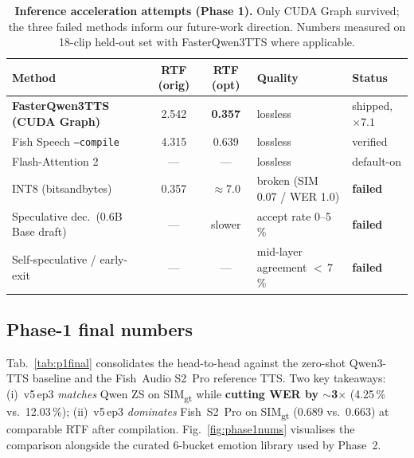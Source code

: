 \documentclass[10pt,a4paper]{article}
\begin{document}
\begin{table}[t]
\centering\small
\caption{\textbf{Inference acceleration attempts (Phase 1).} Only CUDA
Graph survived; the three failed methods inform our future-work direction.
Numbers measured on 18-clip held-out set with FasterQwen3TTS where
applicable.}
\label{tab:accel}
\footnotesize
\begin{tabular}{@{}lccll@{}}
\toprule
\textbf{Method} & \textbf{RTF (orig)} & \textbf{RTF (opt)} &
\textbf{Quality} & \textbf{Status} \\
\midrule
\rowcolor{success!8}
\textbf{FasterQwen3TTS (CUDA Graph)} & 2.542 & \textbf{0.357} & lossless     & shipped, $\times7.1$ \\
Fish Speech \texttt{--compile}        & 4.315 & 0.639          & lossless     & verified \\
Flash-Attention 2                     & ---    & ---            & lossless     & default-on \\
\rowcolor{fail!7}
INT8 (bitsandbytes)                   & 0.357  & $\approx$7.0   & broken (SIM 0.07 / WER 1.0) & \textbf{failed} \\
\rowcolor{fail!7}
Speculative dec.\ (0.6B Base draft)    & ---    & slower         & accept rate 0--5\,\% & \textbf{failed} \\
\rowcolor{fail!7}
Self-speculative / early-exit         & ---    & ---            & mid-layer agreement $<$\,7\,\% & \textbf{failed} \\
\bottomrule
\end{tabular}
\end{table}

\subsection{Phase-1 final numbers}

Tab.~\ref{tab:p1final} consolidates the head-to-head against the
zero-shot Qwen3-TTS baseline and the Fish~Audio S2~Pro reference TTS.
Two key takeaways:
(i)~v5\,ep3 \emph{matches} Qwen ZS on SIM\textsubscript{gt} while
\textbf{cutting WER by $\sim$3$\times$} (4.25\,\% vs.\ 12.03\,\%);
(ii)~v5\,ep3 \emph{dominates} Fish~S2~Pro on SIM\textsubscript{gt}
(0.689 vs.\ 0.663) at comparable RTF after compilation.
Fig.~\ref{fig:phase1nums} visualises the comparison alongside the curated
6-bucket emotion library used by Phase~2.
\end{document}
